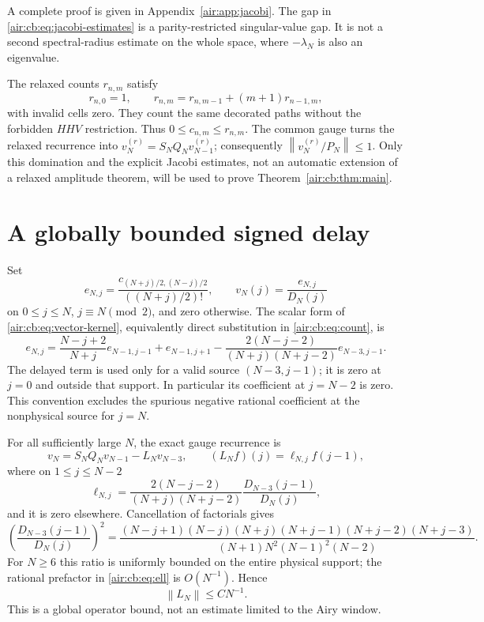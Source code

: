 \documentclass[11pt,letterpaper]{article}
\numberwithin{equation}{section}
\theoremstyle{remark}
\newcommand{\norm}[1]{\left\lVert#1\right\rVert}
\begin{document}
A complete proof is given in Appendix~\ref{air:app:jacobi}. The gap in
\eqref{air:cb:eq:jacobi-estimates} is a parity-restricted singular-value gap. It is
not a second spectral-radius estimate on the whole space, where
$-\lambda_N$ is also an eigenvalue.

The relaxed counts $r_{n,m}$ satisfy
\[
r_{n,0}=1,\qquad r_{n,m}=r_{n,m-1}+(m+1)r_{n-1,m},
\]
with invalid cells zero. They count the same decorated paths without the
forbidden $HHV$ restriction. Thus $0\le c_{n,m}\le r_{n,m}$. The common
gauge turns the relaxed recurrence into $v_N^{(r)}=S_NQ_Nv_{N-1}^{(r)}$;
consequently $\norm{v_N^{(r)}/P_N}\le1$. Only this domination and the explicit
Jacobi estimates, not an automatic extension of a relaxed amplitude theorem,
will be used to prove Theorem~\ref{air:cb:thm:main}.

\section{A globally bounded signed delay}\label{air:cb:sec:delay}

Set
\[
e_{N,j}=\frac{c_{(N+j)/2,(N-j)/2}}{((N+j)/2)!},\qquad
v_N(j)=\frac{e_{N,j}}{D_N(j)}
\]
on $0\le j\le N$, $j\equiv N\pmod2$, and zero otherwise. The scalar form
of \eqref{air:cb:eq:vector-kernel}, equivalently direct substitution in
\eqref{air:cb:eq:count}, is
\begin{equation}\label{air:cb:eq:ungauged-delay}
e_{N,j}=\frac{N-j+2}{N+j}e_{N-1,j-1}+e_{N-1,j+1}
-\frac{2(N-j-2)}{(N+j)(N+j-2)}e_{N-3,j-1}.
\end{equation}
The delayed term is used only for a valid source $(N-3,j-1)$; it is zero
at $j=0$ and outside that support. In particular its coefficient at $j=N-2$
is zero. This convention excludes the spurious negative rational coefficient
at the nonphysical source for $j=N$.

For all sufficiently large $N$, the exact gauge recurrence is
\begin{equation}\label{air:cb:eq:gauged-delay}
v_N=S_NQ_Nv_{N-1}-L_Nv_{N-3},\qquad
(L_Nf)(j)=\ell_{N,j}f(j-1),
\end{equation}
where on $1\le j\le N-2$
\begin{equation}\label{air:cb:eq:ell}
\ell_{N,j}=\frac{2(N-j-2)}{(N+j)(N+j-2)}
\frac{D_{N-3}(j-1)}{D_N(j)},
\end{equation}
and it is zero elsewhere. Cancellation of factorials gives
\begin{equation}\label{air:cb:eq:gauge-ratio}
\left(\frac{D_{N-3}(j-1)}{D_N(j)}\right)^2
=\frac{(N-j+1)(N-j)(N+j)(N+j-1)(N+j-2)(N+j-3)}
{(N+1)N^2(N-1)^2(N-2)}.
\end{equation}
For $N\ge6$ this ratio is uniformly bounded on the entire physical support;
the rational prefactor in \eqref{air:cb:eq:ell} is $O(N^{-1})$. Hence
\begin{equation}\label{air:cb:eq:global-delay}
\norm{L_N}\le C N^{-1}.
\end{equation}
This is a global operator bound, not an estimate limited to the Airy window.
\end{document}
